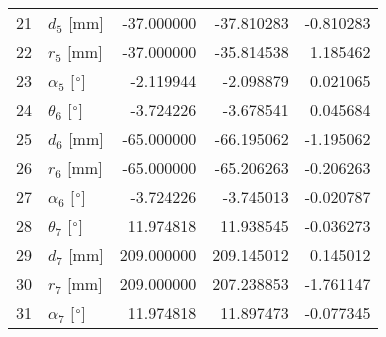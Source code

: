 \documentclass{standalone}%
\begin{document}
\begin{tabular}{llrrr}
21 &              $d_{5}$ [mm] &  -37.000000 &  -37.810283 &  -0.810283 \\
22 &              $r_{5}$ [mm] &  -37.000000 &  -35.814538 &   1.185462 \\
23 &  $\alpha_{5}$ [$\degree$] &   -2.119944 &   -2.098879 &   0.021065 \\
24 &  $\theta_{6}$ [$\degree$] &   -3.724226 &   -3.678541 &   0.045684 \\
25 &              $d_{6}$ [mm] &  -65.000000 &  -66.195062 &  -1.195062 \\
26 &              $r_{6}$ [mm] &  -65.000000 &  -65.206263 &  -0.206263 \\
27 &  $\alpha_{6}$ [$\degree$] &   -3.724226 &   -3.745013 &  -0.020787 \\
28 &  $\theta_{7}$ [$\degree$] &   11.974818 &   11.938545 &  -0.036273 \\
29 &              $d_{7}$ [mm] &  209.000000 &  209.145012 &   0.145012 \\
30 &              $r_{7}$ [mm] &  209.000000 &  207.238853 &  -1.761147 \\
31 &  $\alpha_{7}$ [$\degree$] &   11.974818 &   11.897473 &  -0.077345 \\
\bottomrule
\end{tabular}
%
\end{document}
